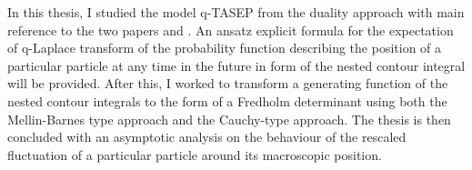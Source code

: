 % 
% 
%
In this thesis, I studied the model q-TASEP from the duality approach with main reference to the two papers \cite{duality2014} and \cite{asymptotics2013}. An ansatz explicit formula for the expectation of q-Laplace transform of the probability function describing the position of a particular particle at any time in the future in form of the nested contour integral will be provided. After this, I worked to transform a generating function of the nested contour integrals to the form of a Fredholm determinant using both the Mellin-Barnes type approach and the Cauchy-type approach. The thesis is then concluded with an asymptotic analysis on the behaviour of the rescaled fluctuation of a particular particle around its macroscopic position.
